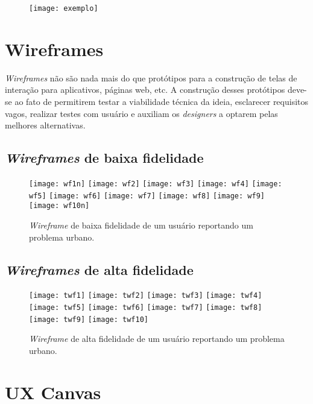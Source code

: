 \documentclass[a4paper,12pt,twoside]{report}
\begin{document}
\begin{figure}[!ht]
\centering
\texttt{[image: exemplo]}
\end{figure}

\chapter{Wireframes}
\textit{Wireframes} não são nada mais do que protótipos para a construção de telas de interação para aplicativos, páginas web, etc.\cite{R0} A construção desses protótipos deve-se ao fato de permitirem testar a viabilidade técnica da ideia, esclarecer requisitos vagos, realizar testes com usuário e auxiliam os \textit{designers} a optarem pelas melhores alternativas.\cite{R0}

\section{\textit{Wireframes} de baixa fidelidade}
\begin{figure}[!ht]
\centering
\texttt{[image: wf1n]}
\texttt{[image: wf2]}
\texttt{[image: wf3]}
\texttt{[image: wf4]}
\texttt{[image: wf5]}
\texttt{[image: wf6]}
\texttt{[image: wf7]}
\texttt{[image: wf8]}
\texttt{[image: wf9]}
\texttt{[image: wf10n]}
\caption{\textit{Wireframe} de baixa fidelidade de um usuário reportando um problema urbano.}
\end{figure}

\clearpage

\section{\textit{Wireframes} de alta fidelidade}
\begin{figure}[!ht]
\centering
\texttt{[image: twf1]}
\texttt{[image: twf2]}
\texttt{[image: twf3]}
\texttt{[image: twf4]}
\texttt{[image: twf5]}
\texttt{[image: twf6]}
\texttt{[image: twf7]}
\texttt{[image: twf8]}
\texttt{[image: twf9]}
\texttt{[image: twf10]}
\caption{\textit{Wireframe} de alta fidelidade de um usuário reportando um problema urbano.}
\end{figure}


\chapter{UX Canvas}
\end{document}
